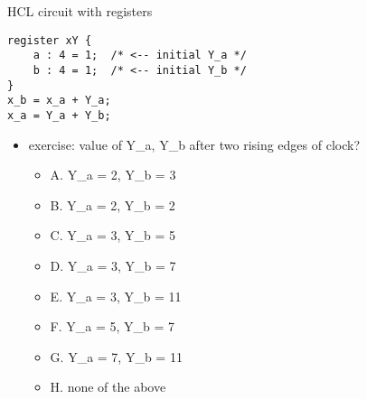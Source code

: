 \usetikzlibrary{arrows.meta,calc,chains,matrix,patterns,positioning,shapes.callouts,shapes.geometric,shapes.misc}


\begin{frame}[fragile,label=hclRegCircuitEx]{HCL circuit with registers}
\begin{Verbatim}
register xY {
    a : 4 = 1;  /* <-- initial Y_a */
    b : 4 = 1;  /* <-- initial Y_b */
}
x_b = x_a + Y_a;
x_a = Y_a + Y_b;
\end{Verbatim}
\begin{itemize}
\item exercise: value of Y\_a, Y\_b after two rising edges of clock?
    \begin{itemize}
    \item A. Y\_a = 2, Y\_b = 3
    \item B. Y\_a = 2, Y\_b = 2
    \item C. Y\_a = 3, Y\_b = 5
    \item D. Y\_a = 3, Y\_b = 7
    \item E. Y\_a = 3, Y\_b = 11
    \item F. Y\_a = 5, Y\_b = 7
    \item G. Y\_a = 7, Y\_b = 11
    \item H. none of the above
    \end{itemize}
    \end{itemize}
\end{frame}
